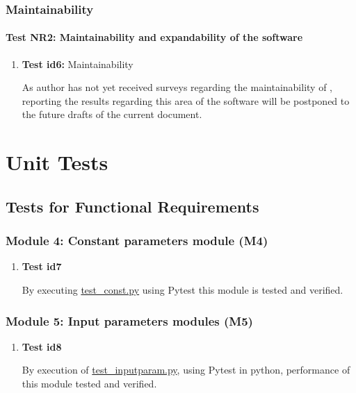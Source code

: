 \documentclass[12pt, titlepage]{article}
\begin{document}
\subsubsection{Maintainability}

\paragraph{Test NR2: Maintainability and expandability of the software}

\begin{enumerate}
	
	\item{\textbf{Test id6:} Maintainability\\}
	
	As author has not yet received surveys regarding the maintainability of \progname{}, reporting the results regarding this area of the software will be postponed to the future drafts of the current document. 
					
\end{enumerate}


\section{Unit Tests} \label{utest}

\subsection{Tests for Functional Requirements}

\subsubsection{Module 4: Constant parameters module (M4)}
\begin{enumerate}
	\item{\textbf{Test id7}  \\}
	
	By executing \href{https://github.com/shmouses/SPDFM/tree/master/src/test_const.py}{test\_const.py} using Pytest this module is tested and verified. 
\end{enumerate}
\subsubsection{Module 5: Input parameters modules (M5)}

\begin{enumerate}
	
	\item{\textbf{Test id8}  \\}
	
	By execution of  \href{https://github.com/shmouses/SPDFM/tree/master/src/test_inputparam.py}{test\_inputparam.py}, using Pytest in python, performance of this module tested and verified.
	
\end{enumerate}
\end{document}
